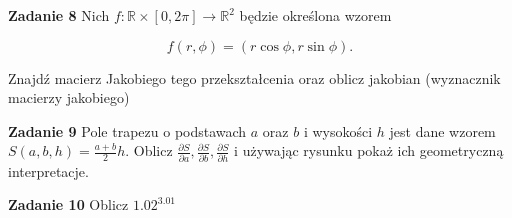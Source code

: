 \documentclass[a4paper,11pt]{article}
\begin{document}
\bigskip

\textbf{Zadanie 8} Nich $f: \mathbb{R} \times [0, 2\pi] \to \mathbb{R}^2$
będzie określona wzorem 

\[
f(r,\phi) = \left( r \cos\phi, r\sin \phi \right) 
.\] 

Znajdź macierz Jakobiego tego przekształcenia oraz oblicz jakobian
(wyznacznik macierzy jakobiego)

\bigskip

\textbf{Zadanie 9} Pole trapezu o podstawach $a$ oraz  $b$ i wysokości
$h$ jest dane wzorem {$S(a,b,h) = \frac{a+b}{2} h$}. Oblicz
$\frac{\partial S}{\partial a}, \frac{\partial S}{\partial b},
\frac{\partial S}{\partial h}$ i używając rysunku pokaż ich geometryczną
interpretacje.

\bigskip

\textbf{Zadanie 10} Oblicz $1.02^{3.01}$
\end{document}
